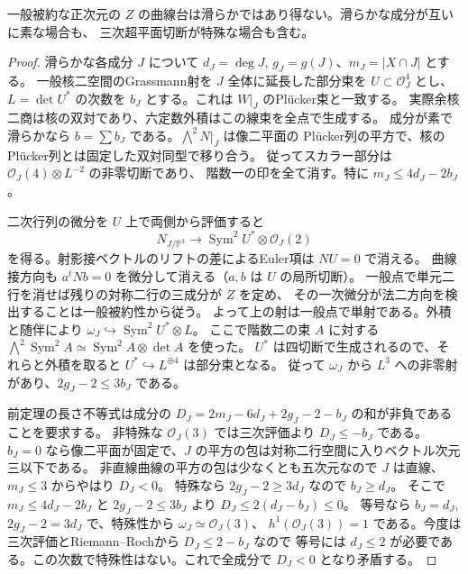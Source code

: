 \begin{corollary}\label{cor:all-smooth-rank-two-excess-exclusion}
一般被約な正次元の $Z$ の曲線台は滑らかではあり得ない。滑らかな成分が互いに素な場合も、
三次超平面切断が特殊な場合も含む。
\end{corollary}
\begin{proof}
滑らかな各成分 $J$ について $d_J=\deg J$, $g_J=g(J)$、$m_J=|X\cap J|$ とする。
一般核二空間のGrassmann射を $J$ 全体に延長した部分束を $U\subset\mathcal O_J^4$ とし、
$L=\det U^*$ の次数を $b_J$ とする。これは $W|_J$ のPlücker束と一致する。
実際余核二商は核の双対であり、六定数外積はこの線束を全点で生成する。
成分が素で滑らかなら $b=\sum b_J$ である。$\bigwedge^2N|_J$ は像二平面の
Plücker列の平方で、核のPlücker列とは固定した双対同型で移り合う。
従ってスカラー部分は $\mathcal O_J(4)\otimes L^{-2}$ の非零切断であり、
階数一の印を全て消す。特に $m_J\le4d_J-2b_J$。

二次行列の微分を $U$ 上で両側から評価すると
\[
       N_{J/\mathbb P^3}\longrightarrow
             \operatorname{Sym}^2 U^*\otimes\mathcal O_J(2)
\]
を得る。射影接ベクトルのリフトの差によるEuler項は $NU=0$ で消える。
曲線接方向も $a^tNb=0$ を微分して消える（$a,b$ は $U$ の局所切断）。
一般点で単元二行を消せば残りの対称二行の三成分が $Z$ を定め、
その一次微分が法二方向を検出することは一般被約性から従う。
よって上の射は一般点で単射である。外積と随伴により
$\omega_J\hookrightarrow\operatorname{Sym}^2U^*\otimes L$。
ここで階数二の束 $A$ に対する $\bigwedge^2\operatorname{Sym}^2 A
\simeq\operatorname{Sym}^2 A\otimes\det A$ を使った。
$U^*$ は四切断で生成されるので、それらと外積を取ると $U^*\hookrightarrow L^{\oplus4}$ は部分束となる。
従って $\omega_J$ から $L^3$ への非零射があり、$2g_J-2\le3b_J$ である。

前定理の長さ不等式は成分の
$D_J=2m_J-6d_J+2g_J-2-b_J$ の和が非負であることを要求する。
非特殊な $\mathcal O_J(3)$ では三次評価より $D_J\le-b_J$ である。
$b_J=0$ なら像二平面が固定で、$J$ の平方の包は対称二行空間に入りベクトル次元三以下である。
非直線曲線の平方の包は少なくとも五次元なので $J$ は直線、$m_J\le3$ からやはり $D_J<0$。
特殊なら $2g_J-2\ge3d_J$ なので $b_J\ge d_J$。
そこで $m_J\le4d_J-2b_J$ と $2g_J-2\le3b_J$ より $D_J\le2(d_J-b_J)\le0$。
等号なら $b_J=d_J$, $2g_J-2=3d_J$ で、特殊性から $\omega_J\simeq\mathcal O_J(3)$、
$h^1(\mathcal O_J(3))=1$ である。今度は三次評価とRiemann--Rochから $D_J\le 2-b_J$ なので
等号には $d_J\le2$ が必要である。この次数で特殊性はない。これで全成分で $D_J<0$ となり矛盾する。
\end{proof}
